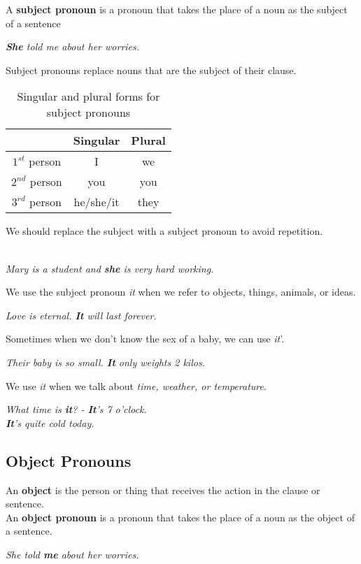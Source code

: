 \documentclass[hidelinks,10pt,a4paper]{article}
\begin{document}
A \textbf{subject pronoun} is a pronoun that takes the place of a noun as the subject of a sentence

\begin{center}
\textit{
\textbf{She} told me about her worries.}
\end{center}
Subject pronouns replace nouns that are the subject of their clause.
\begin{table}[h]
\begin{center}
		\begin{tabular}{|c|c|c|}
		\hline
		& \textbf{Singular} & \textbf{Plural} \\
		\hline
		$1^{st}$ person & I & we \\ \hline
		$2^{nd}$ person & you & you \\ \hline
		$3^{rd}$ person & he/she/it & they \\ \hline
	\end{tabular}
\end{center}
\caption{\label{tab:nouns4}Singular and plural forms for subject pronouns}
\end{table}

\newpage
We should replace the subject with a subject pronoun to avoid repetition.
\begin{center}
\textit{
\\
Mary is a student and \textbf{she} is very hard working.}
\end{center}

We use the subject pronoun \textit{it} when we refer to objects, things, animals, or ideas.
\begin{center}
		\textit{ Love is eternal. \textbf{It} will last forever.}
\end{center}

Sometimes when we don't know the sex of a baby, we can use \textit{it}'.
\begin{center}
\textit{
Their baby is so small. \textbf{It} only weights 2 kilos.}
\end{center}
\hspace{0.4cm} We use \textit{it} when we talk about \textit{time, weather, or temperature}.
\begin{center}
\textit{
	What time is \textbf{it}? - \textbf{It}'s 7 o'clock.\\
	\textbf{It}'s quite cold today.}
\end{center}

\subsection{Object Pronouns}
An \textbf{object} is the person or thing that receives the action in the clause or sentence.\\
An \textbf{object pronoun} is a pronoun that takes the place of a noun as the object of a sentence.
\begin{center}
\textit{
She told \textbf{me} about her worries.}
\end{center}
\end{document}
